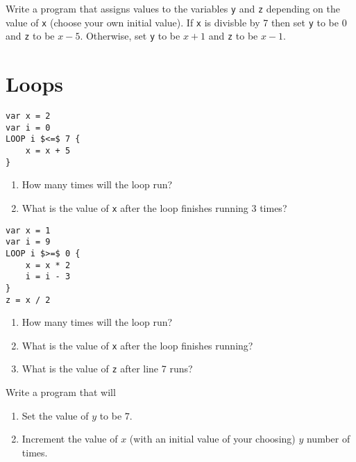 \documentclass{article}
\begin{document}
\begin{Exercise}

Write a program that assigns values to the variables \lstinline{y} and \lstinline{z} depending on the value of \lstinline{x} (choose your own initial value).
If \lstinline{x} is divisble by 7 then set \lstinline{y} to be $0$ and \lstinline{z} to be $x - 5$.
Otherwise, set \lstinline{y} to be $x + 1$ and \lstinline{z} to be $x - 1$.

\end{Exercise}

\section{Loops}
\setcounter{Exercise}{0}

\begin{Exercise}
\begin{lstlisting}[caption={Pseudocode.}, label={code:exercise_loop_1},mathescape]
var x = 2
var i = 0
LOOP i $<=$ 7 {
    x = x + 5
}
\end{lstlisting}

\begin{enumerate}
\item How many times will the loop run?
\item What is the value of \lstinline{x} after the loop finishes running $3$ times?
\end{enumerate}
\end{Exercise}

\begin{Exercise}
\begin{lstlisting}[caption={Pseudocode.}, label={code:exercise_loop_2},mathescape]
var x = 1
var i = 9
LOOP i $>=$ 0 {
    x = x * 2
    i = i - 3
}
z = x / 2
\end{lstlisting}

\begin{enumerate}
\item How many times will the loop run?
\item What is the value of \lstinline{x} after the loop finishes running?
\item What is the value of \lstinline{z} after line 7 runs?
\end{enumerate}
\end{Exercise}

\begin{Exercise}

Write a program that will
\begin{enumerate}
\item Set the value of $y$ to be $7$.
\item Increment the value of $x$ (with an initial value of your choosing) $y$ number of times.
\end{enumerate}

\end{Exercise}
\end{document}
